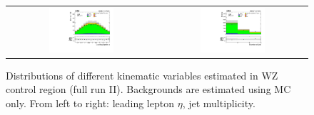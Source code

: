 \begin{figure}[tbh!]
 \begin{center}
 \begin{tabular}{cc}
 \includegraphics[width=0.45\textwidth]{figures/Part3/Selection/WZ/mumumu/lep1Eta}&
 \includegraphics[width=0.45\textwidth]{figures/Part3/Selection/WZ/mumumu/njet} \\
 \end{tabular}
 \caption{Distributions of different kinematic variables estimated in WZ control region (full run II). Backgrounds are estimated using MC only. From left to right: leading lepton $\eta$, jet multiplicity.}
 \label{fig:WZ_mumumu}
 \end{center}
\end{figure}

